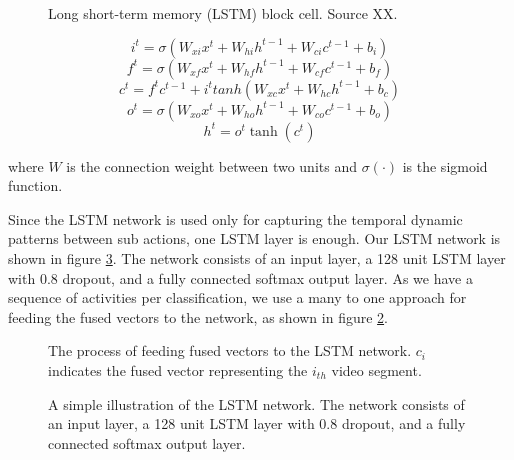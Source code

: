 \begin{figure}
  \centering
  
  \caption{Long short-term memory (LSTM) block cell. Source XX.}\label{fi:lstmblock}
\end{figure}

\begin{equation}
i^{t} = \sigma (W_{xi}x^t + W_{hi}h^{t-1} + W_{ci}c^{t-1} + b_{i})
\end{equation}
\begin{equation}
f^{t} = \sigma (W_{xf}x^t + W_{hf}h^{t-1} + W_{cf}c^{t-1} + b_{f})
\end{equation}
\begin{equation}
c^{t} = f^tc^{t-1} + i^ttanh(W_{xc}x^t + W_{hc}h^{t-1} + b_{c})
\end{equation}
\begin{equation}
o^{t} = \sigma (W_{xo}x^t + W_{ho}h^{t-1} + W_{co}c^{t-1} + b_{o})
\end{equation}
\begin{equation}
h^t = o^t\tanh(c^t)
\end{equation}

where $W$ is the connection weight between two units and $\sigma(\cdot)$ is the sigmoid function.

Since the LSTM network is used only for capturing the temporal dynamic patterns between sub actions, one LSTM layer is enough.
Our LSTM network is shown in figure \ref{fi:layers}. The network consists of an input layer, a 128 unit LSTM layer with 0.8 dropout, and
a fully connected softmax output layer. As we have a sequence of activities per classification, we use a many to one approach
for feeding the fused vectors to the network, as shown in figure \ref{fi:lstm}.

\begin{figure}
  \centering
  
  \caption{The process of feeding fused vectors to the LSTM network. $c_{i}$ indicates the fused vector representing the $i_{th}$
  video segment.}\label{fi:lstm}
\end{figure}

\begin{figure}
  \centering
  
  \caption{A simple illustration of the LSTM network. The network consists of an input layer, a 128 unit LSTM layer with 0.8 dropout, and
a fully connected softmax output layer.}\label{fi:layers}
\end{figure}

